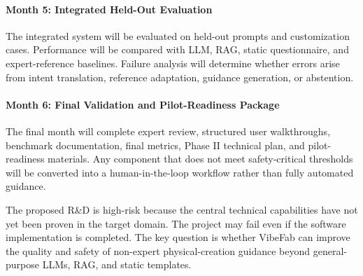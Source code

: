 \vspace{-10pt}
\paragraph{Month 5: Integrated Held-Out Evaluation}

The integrated system will be evaluated on held-out prompts and customization cases. Performance will be compared with LLM, RAG, static questionnaire, and expert-reference baselines. Failure analysis will determine whether errors arise from intent translation, reference adaptation, guidance generation, or abstention.

\vspace{-10pt}
\paragraph{Month 6: Final Validation and Pilot-Readiness Package}

The final month will complete expert review, structured user walkthroughs, benchmark documentation, final metrics, Phase II technical plan, and pilot-readiness materials. Any component that does not meet safety-critical thresholds will be converted into a human-in-the-loop workflow rather than fully automated guidance.




The proposed R\&D is high-risk because the central technical capabilities have not yet been proven in the target domain. The project may fail even if the software implementation is completed. The key question is whether VibeFab can improve the quality and safety of non-expert physical-creation guidance beyond general-purpose LLMs, RAG, and static templates.

